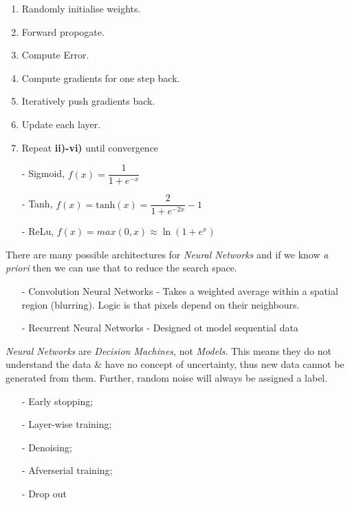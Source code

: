 \documentclass[11pt,a4paper]{article}
\begin{document}
\begin{enumerate}[label=\roman*)]
	\item Randomly initialise weights.
	\item Forward propogate.
	\item Compute Error.
	\item Compute gradients for one step back.
	\item Iteratively push gradients back.
	\item Update each layer.
	\item Repeat \textbf{ii)-vi)} until convergence
\end{enumerate}

\begin{itemize}
	\item[-] Sigmoid, $f(x)=\dfrac{1}{1+e^{-x}}$
	\item[-] Tanh, $f(x)=\text{tanh}(x)=\dfrac{2}{1+e^{-2x}}-1$
	\item[-] ReLu, $f(x)=max(0,x)\approx\ln(1+e^x)$
\end{itemize}

There are many possible architectures for \textit{Neural Networks} and if we know \textit{a priori} then we can use that to reduce the search space.
\begin{itemize}
	\item[-] Convolution Neural Networks - Takes a weighted average within a spatial region (\ie blurring). Logic is that pixels depend on their neighbours.
	\item[-] Recurrent Neural Networks - Designed ot model sequential data
\end{itemize}

\textit{Neural Networks} are \textit{Decision Machines}, not \textit{Models}. This means they do not understand the data \& have no concept of uncertainty, thus new data cannot be generated from them. Further, random noise will always be assigned a label.\\

\begin{itemize}
	\item[-] Early stopping;
	\item[-] Layer-wise training;
	\item[-] Denoising;
	\item[-] Afverserial training;
	\item[-] Drop out
\end{itemize}
\end{document}

